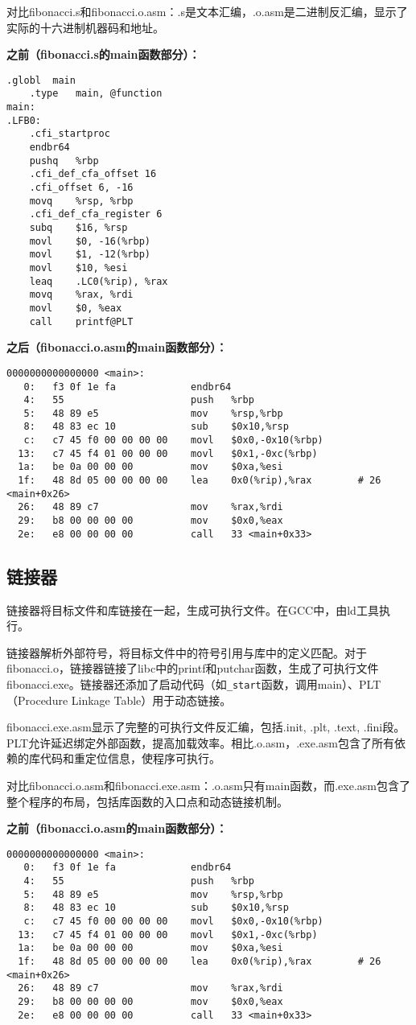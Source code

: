 \documentclass[a4paper]{article}
\begin{document}
对比fibonacci.s和fibonacci.o.asm：.s是文本汇编，.o.asm是二进制反汇编，显示了实际的十六进制机器码和地址。

\textbf{之前（fibonacci.s的main函数部分）：}
\begin{lstlisting}[language={[x86masm]Assembler}]
	.globl	main
	.type	main, @function
main:
.LFB0:
	.cfi_startproc
	endbr64
	pushq	%rbp
	.cfi_def_cfa_offset 16
	.cfi_offset 6, -16
	movq	%rsp, %rbp
	.cfi_def_cfa_register 6
	subq	$16, %rsp
	movl	$0, -16(%rbp)
	movl	$1, -12(%rbp)
	movl	$10, %esi
	leaq	.LC0(%rip), %rax
	movq	%rax, %rdi
	movl	$0, %eax
	call	printf@PLT
\end{lstlisting}

\textbf{之后（fibonacci.o.asm的main函数部分）：}
\begin{lstlisting}[language={[x86masm]Assembler}]
0000000000000000 <main>:
   0:	f3 0f 1e fa          	endbr64
   4:	55                   	push   %rbp
   5:	48 89 e5             	mov    %rsp,%rbp
   8:	48 83 ec 10          	sub    $0x10,%rsp
   c:	c7 45 f0 00 00 00 00 	movl   $0x0,-0x10(%rbp)
  13:	c7 45 f4 01 00 00 00 	movl   $0x1,-0xc(%rbp)
  1a:	be 0a 00 00 00       	mov    $0xa,%esi
  1f:	48 8d 05 00 00 00 00 	lea    0x0(%rip),%rax        # 26 <main+0x26>
  26:	48 89 c7             	mov    %rax,%rdi
  29:	b8 00 00 00 00       	mov    $0x0,%eax
  2e:	e8 00 00 00 00       	call   33 <main+0x33>
\end{lstlisting}

\subsection{链接器}

链接器将目标文件和库链接在一起，生成可执行文件。在GCC中，由ld工具执行。

链接器解析外部符号，将目标文件中的符号引用与库中的定义匹配。对于fibonacci.o，链接器链接了libc中的printf和putchar函数，生成了可执行文件fibonacci.exe。链接器还添加了启动代码（如\texttt{\_start}函数，调用main）、PLT（Procedure Linkage Table）用于动态链接。

fibonacci.exe.asm显示了完整的可执行文件反汇编，包括.init, .plt, .text, .fini段。PLT允许延迟绑定外部函数，提高加载效率。相比.o.asm，.exe.asm包含了所有依赖的库代码和重定位信息，使程序可执行。

对比fibonacci.o.asm和fibonacci.exe.asm：.o.asm只有main函数，而.exe.asm包含了整个程序的布局，包括库函数的入口点和动态链接机制。

\textbf{之前（fibonacci.o.asm的main函数部分）：}
\begin{lstlisting}[language={[x86masm]Assembler}]
0000000000000000 <main>:
   0:	f3 0f 1e fa          	endbr64
   4:	55                   	push   %rbp
   5:	48 89 e5             	mov    %rsp,%rbp
   8:	48 83 ec 10          	sub    $0x10,%rsp
   c:	c7 45 f0 00 00 00 00 	movl   $0x0,-0x10(%rbp)
  13:	c7 45 f4 01 00 00 00 	movl   $0x1,-0xc(%rbp)
  1a:	be 0a 00 00 00       	mov    $0xa,%esi
  1f:	48 8d 05 00 00 00 00 	lea    0x0(%rip),%rax        # 26 <main+0x26>
  26:	48 89 c7             	mov    %rax,%rdi
  29:	b8 00 00 00 00       	mov    $0x0,%eax
  2e:	e8 00 00 00 00       	call   33 <main+0x33>
\end{lstlisting}
\end{document}
